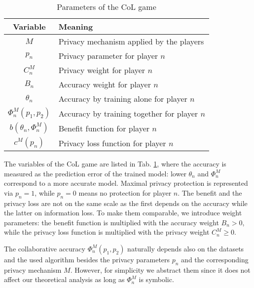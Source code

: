 \documentclass[USenglish,oneside,twocolumn]{article}
\theoremstyle{plain}
\begin{document}
    \vspace{-0.25cm}
    \begin{table}[h]
        \centering
        \begin{tabular}{|c|l|}
            \hline
            \bf{Variable} & \bf{Meaning}\\
            \hline
            $M$ & Privacy mechanism applied by the players\\
            \hline
            $p_n$ & Privacy parameter for player $n$\\
            \hline
            $C_n^M$ & Privacy weight for player $n$\\
            \hline
            $B_n$ & Accuracy weight for player $n$\\
            \hline
            $\theta_n$ & Accuracy by training alone for player $n$\\
            \hline
            $\Phi_n^M(p_1,p_2)$ & Accuracy by training together for player $n$\\
            \hline
            $b(\theta_n,\Phi_n^M)$ & Benefit function for player $n$\\
            \hline
            $c^M(p_n)$ & Privacy loss function for player $n$\\
            \hline
        \end{tabular}
        \vspace{0.1cm}
        \caption{Parameters of the CoL game}
        \label{tab:param}
    \end{table}
    \vspace{-0.75cm}
    
    The variables of the CoL game are listed in Tab. \ref{tab:param}, where the accuracy is measured as the prediction error of the trained model: lower $\theta_n$ and $\Phi_n^M$ correspond to a more accurate model. Maximal privacy protection is represented via $p_n=1$, while $p_n=0$ means no protection for player $n$. The benefit and the privacy loss are not on the same scale as the first depends on the accuracy while the latter on information loss. To make them comparable, we introduce weight parameters: the benefit function is multiplied with the accuracy weight $B_n>0$, while the privacy loss function is multiplied with the privacy weight $C_n^M\geq0$.
    
    The collaborative accuracy $\Phi^M_n(p_1,p_2)$ naturally depends also on the datasets and the used algorithm besides the privacy parameters $p_n$ and the corresponding privacy mechanism $M$. However, for simplicity we abstract them since it does not affect our theoretical analysis as long as $\Phi^M_n$ is symbolic. %
    
\end{document}
